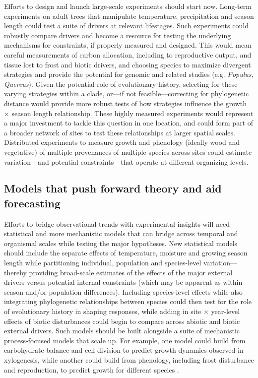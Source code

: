 \documentclass[11pt]{article}
\begin{document}
Efforts to design and launch large-scale experiments should start now. Long-term experiments on adult trees that manipulate temperature, precipitation and season length could test a suite of drivers at relevant lifestages. Such experiments could robustly compare drivers and become a resource for testing the underlying mechanisms for constraints, if properly measured and designed. This would mean careful measurements of carbon allocation, including to reproductive output, and tissue lost to frost and biotic drivers, and choosing species to maximize divergent strategies and provide the potential for genomic and related studies (e.g. \emph{Populus, Quercus}). Given the potential role of evolutionary history, selecting for these varying strategies within a clade, or---if not feasible---correcting for phylogenetic distance would provide more robust tests of how strategies influence the growth $\times$ season length relationship. %
These highly measured experiments  would represent a major investment to tackle this question in one location, and could form part of a broader network of sites to test these relationships at larger spatial scales. Distributed experiments to measure growth and phenology (ideally wood and vegetative) of multiple provenances of multiple species across sites could estimate variation---and potential constraints---that operate at different organizing levels. 

\subsection*{Models that push forward theory and aid forecasting}
Efforts to bridge observational trends with experimental insights will need statistical and more mechanistic models that can bridge across temporal and organismal scales while testing the major hypotheses. New statistical models should include the separate effects of temperature, moisture and growing season length while partitioning individual, population and species-level variation---thereby providing broad-scale estimates of the effects of the major external drivers versus potential internal constraints (which may be apparent as within-season and/or population differences). Including species-level effects while also integrating phylogenetic relationships between species could then test for the role of evolutionary history in shaping responses, while adding in site $\times$ year-level effects of biotic disturbances could begin to compare across abiotic and biotic external drivers. Such models should be built alongside a suite of mechanistic process-focused models that scale up. For example, one model could build from carbohydrate balance and cell division \citep[e.g.][]{locosselli2017dendrobiochemistry} to predict growth dynamics observed in xylogenesis, while another could build from phenology, including frost disturbance and reproduction, to predict growth for different species \citep[e.g.][]{chuineJTB}. 
\end{document}
